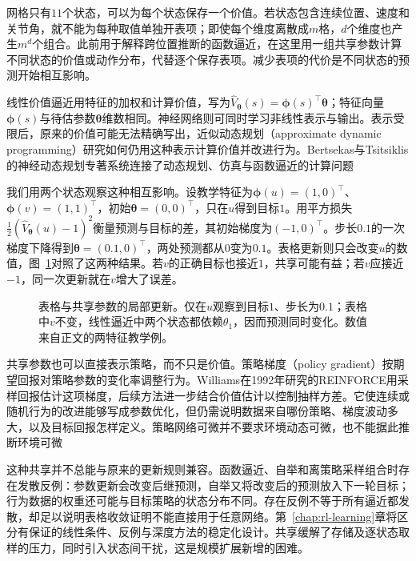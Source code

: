 网格只有$11$个状态，可以为每个状态保存一个价值。若状态包含连续位置、速度和关节角，就不能为每种取值单独开表项；即使每个维度离散成$m$格，$d$个维度也产生$m^d$个组合。此前用于解释跨位置推断的函数逼近，在这里用一组共享参数计算不同状态的价值或动作分布，代替逐个保存表项。减少表项的代价是不同状态的预测开始相互影响。

线性价值逼近用特征的加权和计算价值，写为$\widehat V_{\bm\theta}(s)=\bm\phi(s)^\top\bm\theta$；特征向量$\bm\phi(s)$与待估参数$\bm\theta$维数相同。神经网络则可同时学习非线性表示与输出。表示受限后，原来的价值可能无法精确写出，近似动态规划（approximate dynamic programming）研究如何仍用这种表示计算价值并改进行为。Bertsekas与Tsitsiklis的神经动态规划专著系统连接了动态规划、仿真与函数逼近的计算问题

我们用两个状态观察这种相互影响。设教学特征为$\bm\phi(u)=(1,0)^\top$、$\bm\phi(v)=(1,1)^\top$，初始$\bm\theta=(0,0)^\top$，只在$u$得到目标$1$。用平方损失$\tfrac12(\widehat V_{\bm\theta}(u)-1)^2$衡量预测与目标的差，其初始梯度为$(-1,0)^\top$。步长$0.1$的一次梯度下降得到$\bm\theta=(0.1,0)^\top$，两处预测都从$0$变为$0.1$。表格更新则只会改变$u$的数值，图~\ref{fig:rl-overview-approximation}对照了这两种结果。若$v$的正确目标也接近$1$，共享可能有益；若$v$应接近$-1$，同一次更新就在$v$增大了误差。

\begin{figure}[htbp]
  \centering
  
  \caption{表格与共享参数的局部更新。仅在$u$观察到目标$1$、步长为$0.1$；表格中$v$不变，线性逼近中两个状态都依赖$\theta_1$，因而预测同时变化。数值来自正文的两特征教学例。}
  \label{fig:rl-overview-approximation}
\end{figure}

共享参数也可以直接表示策略，而不只是价值。策略梯度（policy gradient）按期望回报对策略参数的变化率调整行为。Williams在1992年研究的REINFORCE用采样回报估计这项梯度，后续方法进一步结合价值估计以控制抽样方差。它使连续或随机行为的改进能够写成参数优化，但仍需说明数据来自哪份策略、梯度波动多大，以及目标回报怎样定义。策略网络可微并不要求环境动态可微，也不能据此推断环境可微

这种共享并不总能与原来的更新规则兼容。函数逼近、自举和离策略采样组合时存在发散反例：参数更新会改变后继预测，自举又将改变后的预测放入下一轮目标；行为数据的权重还可能与目标策略的状态分布不同。存在反例不等于所有逼近都发散，却足以说明表格收敛证明不能直接用于任意网络。第~\ref{chap:rl-learning}章将区分有保证的线性条件、反例与深度方法的稳定化设计。共享缓解了存储及逐状态取样的压力，同时引入状态间干扰，这是规模扩展新增的困难。


